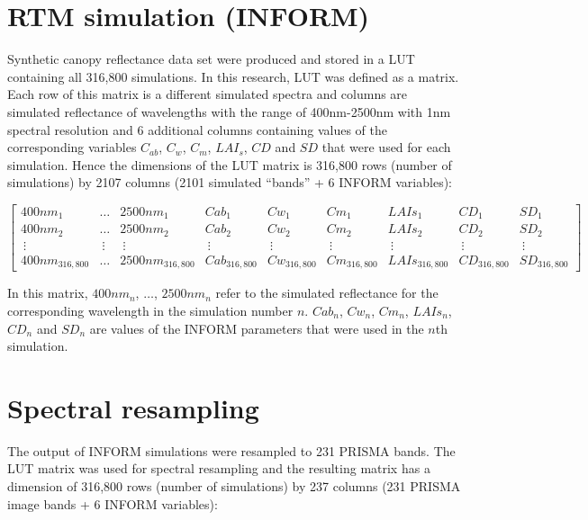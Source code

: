 \documentclass[a4paper, twoside]{templates/ociamthesis}
\begin{document}
\newpage

\hypertarget{rtm-simulation-inform-1}{%
\section{RTM simulation (INFORM)}\label{rtm-simulation-inform-1}}

Synthetic canopy reflectance data set were produced and stored in a LUT containing all 316,800 simulations. In this research, LUT was defined as a matrix. Each row of this matrix is a different simulated spectra and columns are simulated reflectance of wavelengths with the range of 400nm-2500nm with 1nm spectral resolution and 6 additional columns containing values of the corresponding variables \(C_{ab}\), \(C_{w}\), \(C_{m}\), \(LAI_{s}\), \(CD\) and \(SD\) that were used for each simulation. Hence the dimensions of the LUT matrix is 316,800 rows (number of simulations) by 2107 columns (2101 simulated ``bands'' + 6 INFORM variables):

\begingroup
\tiny

\[
\begin{bmatrix}
400nm_{1} & \dots & 2500nm_{1} & Cab_{1} & Cw_{1} & Cm_{1} & LAIs_{1} & CD_{1} & SD_{1}\\
400nm_{2} & \dots & 2500nm_{2} & Cab_{2} & Cw_{2} & Cm_{2} & LAIs_{2} & CD_{2} & SD_{2}\\
\ \vdots  &\ \vdots &\ \vdots &\ \vdots &\ \vdots &\ \vdots &\ \vdots &\ \vdots &\ \vdots\\
400nm_{316,800} & \dots & 2500nm_{316,800} & Cab_{316,800} & Cw_{316,800} & Cm_{316,800} & LAIs_{316,800} & CD_{316,800} & SD_{316,800}
\end{bmatrix}
\]
\endgroup

In this matrix, \(400nm_{n}\), \(\dots\), \(2500nm_{n}\) refer to the simulated reflectance for the corresponding wavelength in the simulation number \(n\). \(Cab_{n}\), \(Cw_{n}\), \(Cm_{n}\), \(LAIs_{n}\), \(CD_{n}\) and \(SD_{n}\) are values of the INFORM parameters that were used in the \(n\)th simulation.

\hypertarget{spectral-resampling-1}{%
\section{Spectral resampling}\label{spectral-resampling-1}}

The output of INFORM simulations were resampled to 231 PRISMA bands. The LUT matrix was used for spectral resampling and the resulting matrix has a dimension of 316,800 rows (number of simulations) by 237 columns (231 PRISMA image bands + 6 INFORM variables):
\end{document}
